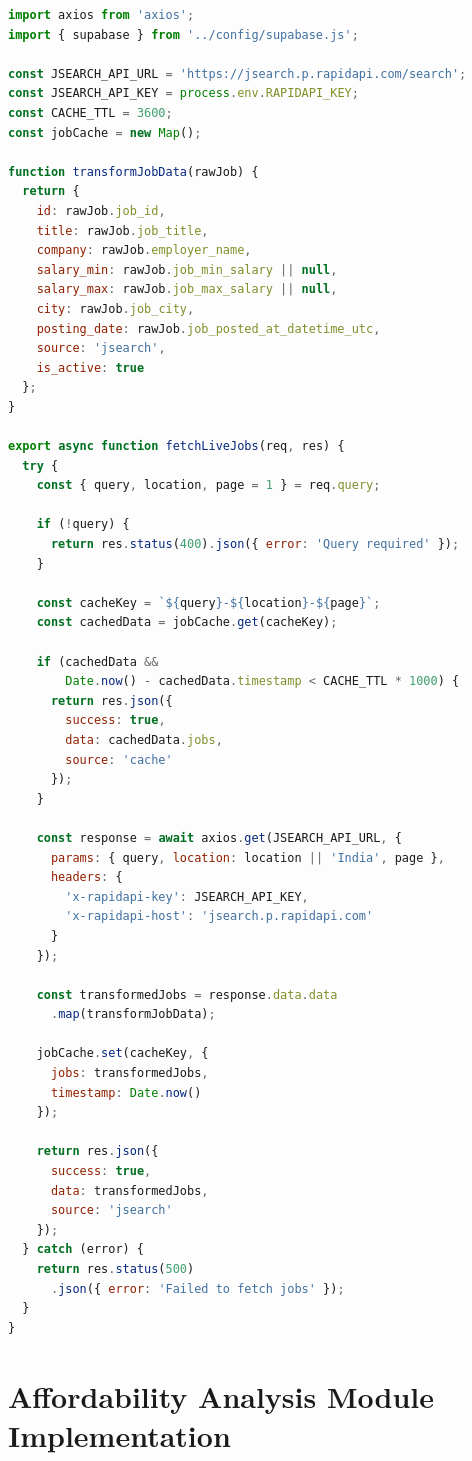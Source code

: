 \documentclass[12pt,a4paper,oneside]{report}
\begin{document}
\begin{lstlisting}[language=JavaScript, caption=Job Discovery Controller using JSearch API, label=lst:job_discovery]
import axios from 'axios';
import { supabase } from '../config/supabase.js';

const JSEARCH_API_URL = 'https://jsearch.p.rapidapi.com/search';
const JSEARCH_API_KEY = process.env.RAPIDAPI_KEY;
const CACHE_TTL = 3600;
const jobCache = new Map();

function transformJobData(rawJob) {
  return {
    id: rawJob.job_id,
    title: rawJob.job_title,
    company: rawJob.employer_name,
    salary_min: rawJob.job_min_salary || null,
    salary_max: rawJob.job_max_salary || null,
    city: rawJob.job_city,
    posting_date: rawJob.job_posted_at_datetime_utc,
    source: 'jsearch',
    is_active: true
  };
}

export async function fetchLiveJobs(req, res) {
  try {
    const { query, location, page = 1 } = req.query;
    
    if (!query) {
      return res.status(400).json({ error: 'Query required' });
    }

    const cacheKey = `${query}-${location}-${page}`;
    const cachedData = jobCache.get(cacheKey);
    
    if (cachedData && 
        Date.now() - cachedData.timestamp < CACHE_TTL * 1000) {
      return res.json({
        success: true,
        data: cachedData.jobs,
        source: 'cache'
      });
    }

    const response = await axios.get(JSEARCH_API_URL, {
      params: { query, location: location || 'India', page },
      headers: {
        'x-rapidapi-key': JSEARCH_API_KEY,
        'x-rapidapi-host': 'jsearch.p.rapidapi.com'
      }
    });

    const transformedJobs = response.data.data
      .map(transformJobData);
    
    jobCache.set(cacheKey, {
      jobs: transformedJobs,
      timestamp: Date.now()
    });

    return res.json({
      success: true,
      data: transformedJobs,
      source: 'jsearch'
    });
  } catch (error) {
    return res.status(500)
      .json({ error: 'Failed to fetch jobs' });
  }
}
\end{lstlisting}

\section{Affordability Analysis Module Implementation}
\end{document}
